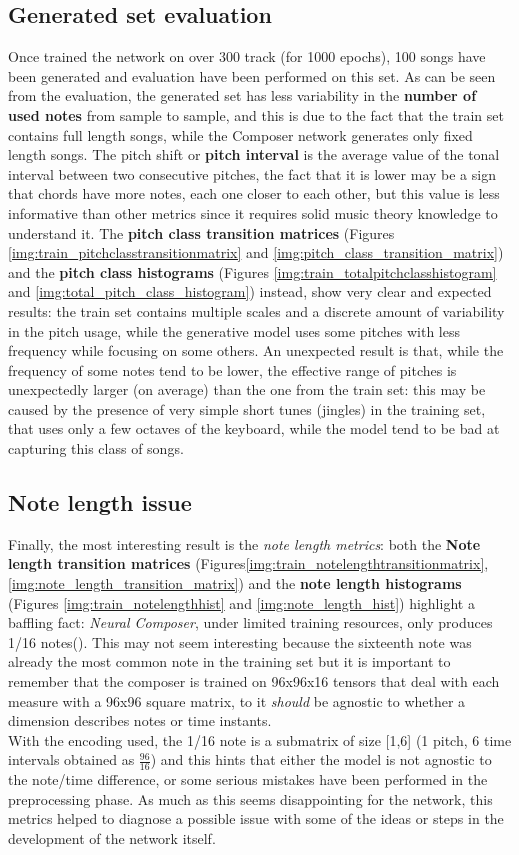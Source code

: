 \documentclass[10pt,twocolumn,letterpaper]{article}
\begin{document}
\subsection{Generated set evaluation}
Once trained the network on over 300 track (for 1000 epochs), 100 songs have been generated and evaluation have been performed on this set.
As can be seen from the evaluation, the generated set has less variability in the \textbf{number of used notes} from sample to sample, and this is due to the fact that the train set contains full length songs, while the Composer network generates only fixed length songs. The pitch shift or \textbf{pitch interval} is the average value of the tonal interval between two consecutive pitches, the fact that it is lower may be a sign that chords have more notes, each one closer to each other, but this value is less informative than other metrics since it requires solid music theory knowledge to understand it. The \textbf{pitch class transition matrices} (Figures \ref{img:train_pitchclasstransitionmatrix} and \ref{img:pitch_class_transition_matrix}) and the \textbf{pitch class histograms} (Figures \ref{img:train_totalpitchclasshistogram} and \ref{img:total_pitch_class_histogram}) instead, show very clear and expected results: the train set contains multiple scales and a discrete amount of variability in the pitch usage, while the generative model uses some pitches with less frequency while focusing on some others.
An unexpected result is that, while the frequency of some notes tend to be lower, the effective range of pitches is unexpectedly larger (on average) than the one from the train set: this may be caused by the presence of very simple short tunes (jingles) in the training set, that uses only a few octaves of the keyboard, while the model tend to be bad at capturing this class of songs.
\subsection{Note length issue}
Finally, the most interesting result is the \textit{note length metrics}: both the  \textbf{Note length transition matrices}  (Figures\ref{img:train_notelengthtransitionmatrix},\ref{img:note_length_transition_matrix}) and the \textbf{note length histograms} (Figures \ref{img:train_notelengthhist} and \ref{img:note_length_hist}) highlight a baffling fact:
\textit{Neural Composer}, under limited training resources, only produces 1/16 notes(\Sech). This may not seem interesting because the sixteenth note was already the most common note in the training set but it is important to remember that the composer is trained on 96x96x16 tensors that deal with each measure with a 96x96 square matrix, to it \textit{should} be agnostic to whether a dimension describes notes or time instants.\\
With the encoding used, the 1/16 note is a submatrix of size [1,6] (1 pitch, 6 time intervals obtained as $\frac{96}{16}$) and this hints that either the model is not agnostic to the note/time difference, or some serious mistakes have been performed in the preprocessing phase.
As much as this seems disappointing for the network, this metrics helped to diagnose a possible issue with some of the ideas or steps in the development of the network itself.
\end{document}
